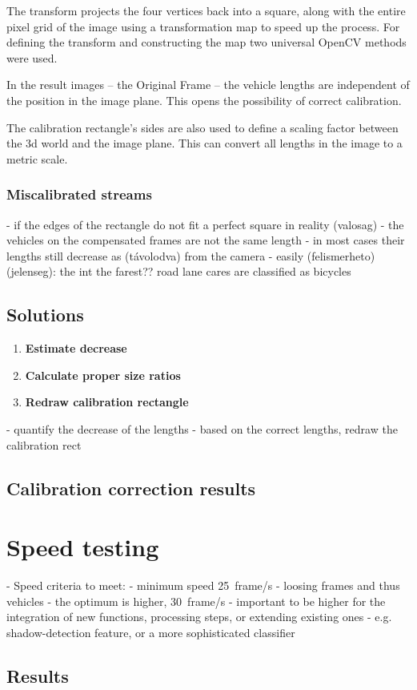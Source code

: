The transform projects the four vertices back into a square, along with the entire pixel grid of the image using a transformation map to speed up the process.
For defining the transform and constructing the map two universal OpenCV methods were used\cite{PersTrans, WrapPers}.

In the result images -- the Original Frame -- the vehicle lengths are independent of the position in the image plane. 
This opens the possibility of correct calibration.

The calibration rectangle's sides are also used to define a scaling factor between the 3d world and the image plane.
This can convert all lengths in the image to a metric scale.

\subsubsection{Miscalibrated streams}
- if the edges of the rectangle do not fit a perfect square in reality (valosag)
- the vehicles on the compensated frames are not the same length
- in most cases their lengths still decrease as (távolodva) from the camera
- easily (felismerheto) (jelenseg): the int the farest?? road lane cares are classified as bicycles

\subsection{Solutions}
\begin{enumerate}
	\item  \textbf{Estimate decrease}
	\item  \textbf{Calculate proper size ratios}
	\item  \textbf{Redraw calibration rectangle}
\end{enumerate}
- quantify the decrease of the lengths
- based on the correct lengths, redraw the calibration rect

\subsection{Calibration correction results}

\section{Speed testing}
- Speed criteria to meet:
	- minimum speed \SI{25}{frame/s}
	- loosing frames and thus vehicles
	- the optimum is higher, \SI{30}{frame/s}
	- important to be higher for the integration of new functions, processing steps, or extending existing ones
	- e.g. shadow-detection feature, or a more sophisticated classifier

\subsection{Results}
